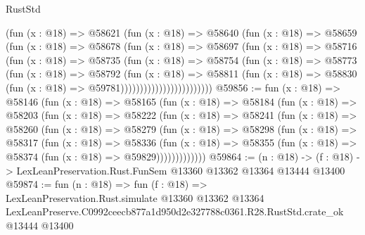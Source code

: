 \begin{lexlean}{RustStd}
\begin{coremodule}
                          (fun (x : @18) =>
                          @58621
                            (fun (x : @18) =>
                            @58640
                              (fun (x : @18) =>
                              @58659
                                (fun (x : @18) =>
                                @58678
                                  (fun (x : @18) =>
                                  @58697
                                    (fun (x : @18) =>
                                    @58716
                                      (fun (x : @18) =>
                                      @58735
                                        (fun (x : @18) =>
                                        @58754
                                          (fun (x : @18) =>
                                          @58773
                                            (fun (x : @18) =>
                                            @58792
                                              (fun (x : @18) =>
                                              @58811
                                                (fun (x : @18) =>
                                                @58830
                                                  (fun (x : @18) => @59781))))))))))))))))))))))))
@59856 := fun (x : @18) =>
  @58146
    (fun (x : @18) =>
    @58165
      (fun (x : @18) =>
      @58184
        (fun (x : @18) =>
        @58203
          (fun (x : @18) =>
          @58222
            (fun (x : @18) =>
            @58241
              (fun (x : @18) =>
              @58260
                (fun (x : @18) =>
                @58279
                  (fun (x : @18) =>
                  @58298
                    (fun (x : @18) =>
                    @58317
                      (fun (x : @18) =>
                      @58336
                        (fun (x : @18) =>
                        @58355 (fun (x : @18) => @58374 (fun (x : @18) => @59829)))))))))))))
@59864 := (n : @18) ->
  (f : @18) -> LexLeanPreservation.Rust.FunSem @13360 @13362 @13364 @13444 @13400
@59874 := fun (n : @18) =>
  fun (f : @18) =>
  LexLeanPreservation.Rust.simulate
    @13360
    @13362
    @13364
    LexLeanPreserve.C0992ceecb877a1d950d2e327788c0361.R28.RustStd.crate_ok
    @13444
    @13400
\end{coremodule}
\end{lexlean}
